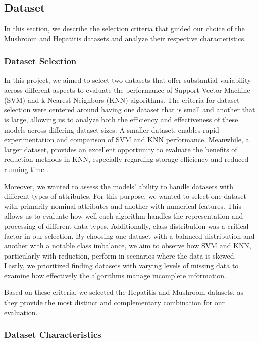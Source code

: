 \subsection{Dataset}
\label{subsec:dataset}

In this section, we describe the selection criteria that guided our choice of the Mushroom and Hepatitis datasets and analyze their respective characteristics.

\subsubsection{Dataset Selection}
In this project, we aimed to select two datasets that offer substantial variability across different aspects to evaluate the performance of Support Vector Machine (SVM) and k-Nearest Neighbors (KNN) algorithms.
The criteria for dataset selection were centered around having one dataset that is small and another that is large, allowing us to analyze both the efficiency and effectiveness of these models across differing dataset sizes.
A smaller dataset, enables rapid experimentation and comparison of SVM and KNN performance.
Meanwhile, a larger dataset, provides an excellent opportunity to evaluate the benefits of reduction methods in KNN, especially regarding storage efficiency and reduced running time \cite{distance_func_knn}.

Moreover, we wanted to assess the models' ability to handle datasets with different types of attributes.
For this purpose, we wanted to select one dataset with primarily nominal attributes and another with numerical features.
This allows us to evaluate how well each algorithm handles the representation and processing of different data types.
Additionally, class distribution was a critical factor in our selection. By choosing one dataset with a balanced distribution and another with a notable class imbalance, we aim to observe how SVM and KNN, particularly with reduction, perform in scenarios where the data is skewed.
Lastly, we prioritized finding datasets with varying levels of missing data to examine how effectively the algorithms manage incomplete information.

Based on these criteria, we selected the Hepatitis and Mushroom datasets, as they provide the most distinct and complementary combination for our evaluation.

\subsubsection{Dataset Characteristics}

